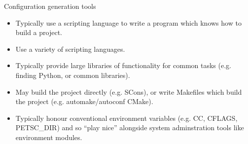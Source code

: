\documentclass[t]{beamer}
\begin{document}
\begin{frame}{Configuration generation tools}

  \begin{itemize}
  \item Typically use a scripting language to write a program which knows
    how to build a project.
  \item Use a variety of scripting languages.
  \item Typically provide large libraries of functionality for common tasks
    (e.g. finding Python, or common libraries).
  \item May build the project directly (e.g. SCons), or write Makefiles which
    build the project (e.g. automake/autoconf CMake).
  \item Typically honour conventional environment variables (e.g. CC,
    CFLAGS, PETSC\_DIR) and so ``play nice'' alongside system adminstration
    tools like environment modules.
  \end{itemize}
  
\end{frame}
\end{document}
